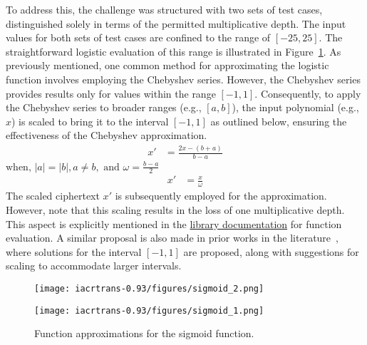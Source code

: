 \documentclass[journal=tosc,final]{iacrtrans}
\begin{document}
To address this, the challenge was structured with two sets of test cases, distinguished solely in terms of the permitted multiplicative depth. The input values for both sets of test cases are confined to the range of $[-25, 25]$. The straightforward logistic evaluation of this range is illustrated in Figure~\ref{fig:sigmoid_approx_cheb}. As previously mentioned, one common method for approximating the logistic function involves employing the Chebyshev series. However, the Chebyshev series provides results only for values within the range $[-1,1]$. Consequently, to apply the Chebyshev series to broader ranges (e.g., $[a,b]$), the input polynomial (e.g., $x$) is scaled to bring it to the interval $[-1,1]$ as outlined below, ensuring the effectiveness of the Chebyshev approximation.
\begin{align}
    x' & = \frac{2x - (b+a)}{b-a}
\end{align}
    $ \text{when, } |a|=|b|, a \neq b, \text{ and } \omega=\frac{b-a}{2} $
\begin{align}
    x' & =  \frac{x}{\omega}
\end{align}
The scaled ciphertext $x'$ is subsequently employed for the approximation. However, note that this scaling results in the loss of one multiplicative depth. This aspect is explicitly mentioned in the \href{https://github.com/openfheorg/openfhe-development/blob/main/src/pke/examples/FUNCTION_EVALUATION.md}{library documentation} for function evaluation. A similar proposal is also made in prior works in the literature~\cite{Sign_approx_comp_poly}, where solutions for the interval $[-1,1]$ are proposed, along with suggestions for scaling to accommodate larger intervals.

\begin{figure}[t]
    \begin{minipage}{.48\textwidth}
    \centering
    \texttt{[image: iacrtrans-0.93/figures/sigmoid\_2.png]}
    \end{minipage}
    \hfill
    \begin{minipage}{.48\textwidth}
    \centering
    \texttt{[image: iacrtrans-0.93/figures/sigmoid\_1.png]}
    \end{minipage}
    \caption{Function approximations for the sigmoid function.}
    \label{fig:sigmoid_approx_cheb}
\end{figure}
\end{document}
